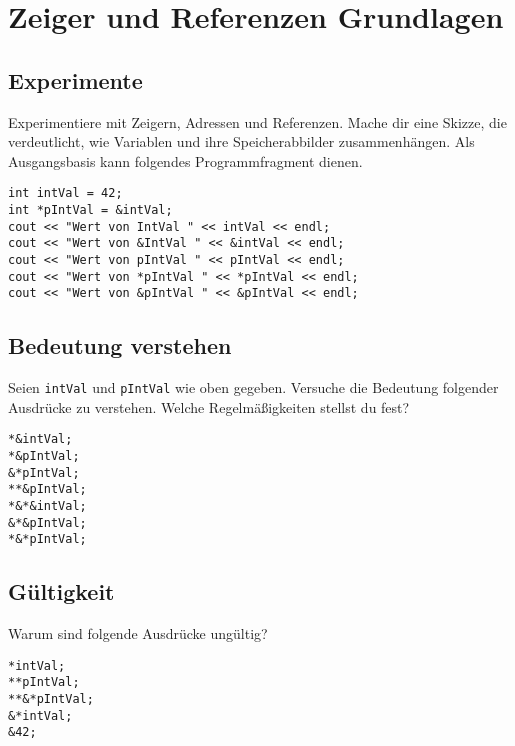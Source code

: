 

\newcommand{\exday}{2}

\cppSetTitle



\cppSetHeaderAndMakeTitle

\section{Zeiger und Referenzen Grundlagen}

\subsection{Experimente}
Experimentiere mit Zeigern, Adressen und Referenzen.
Mache dir eine Skizze, die verdeutlicht, wie Variablen und ihre Speicherabbilder zusammenhängen.
Als Ausgangsbasis kann folgendes Programmfragment dienen.

\begin{lstlisting}
int intVal = 42;
int *pIntVal = &intVal;
cout << "Wert von IntVal " << intVal << endl;
cout << "Wert von &IntVal " << &intVal << endl;
cout << "Wert von pIntVal " << pIntVal << endl;
cout << "Wert von *pIntVal " << *pIntVal << endl;
cout << "Wert von &pIntVal " << &pIntVal << endl;
\end{lstlisting}

\subsection{Bedeutung verstehen}
Seien \texttt{intVal} und \texttt{pIntVal} wie oben gegeben.
Versuche die Bedeutung folgender Ausdrücke zu verstehen.
Welche Regelmäßigkeiten stellst du fest?

\begin{lstlisting}
*&intVal;
*&pIntVal;
&*pIntVal;
**&pIntVal;
*&*&intVal;
&*&pIntVal;
*&*pIntVal;
\end{lstlisting}



\subsection{Gültigkeit}
Warum sind folgende Ausdrücke ungültig?

\begin{lstlisting}
*intVal;
**pIntVal;
**&*pIntVal;
&*intVal;
&42;
\end{lstlisting}

